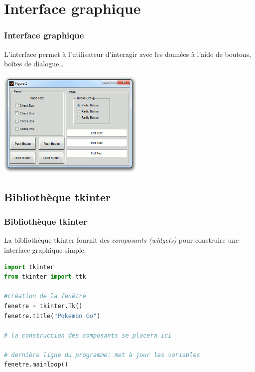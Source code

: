 \documentclass[svgnames,11pt]{beamer}
\begin{document}
\section{Interface graphique}

\begin{frame}
    \frametitle{Interface graphique}

    L'interface permet à l'utilisateur d'interagir avec les données à l'aide de boutons, boîtes de dialogue\dots
    \begin{center}
        \centering
        \includegraphics[width=7cm]{ressources/interface.png}
        \label{IMG}
    \end{center}

\end{frame}
\subsection{Bibliothèque tkinter}
\begin{frame}[fragile]
    \frametitle{Bibliothèque tkinter}

    La bibliothèque tkinter fournit des \emph{composants (widgets)} pour construire une interface graphique simple.
    \begin{center}
        \begin{lstlisting}[language=Python,basicstyle=\small,xrightmargin=1em]
import tkinter
from tkinter import ttk

#création de la fenêtre
fenetre = tkinter.Tk()
fenetre.title("Pokemon Go")

# la construction des composants se placera ici

# dernière ligne du programme: met à jour les variables 
fenetre.mainloop()
\end{lstlisting}
        \label{interface}
    \end{center}

\end{frame}
\end{document}
